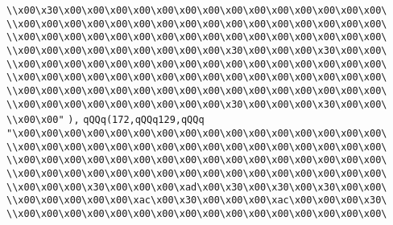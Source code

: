 \verb|\\x00\x30\x00\x00\x00\x00\x00\x00\x00\x00\x00\x00\x00\x00\x00\x00\|\newline
\verb|\\x00\x00\x00\x00\x00\x00\x00\x00\x00\x00\x00\x00\x00\x00\x00\x00\|\newline
\verb|\\x00\x00\x00\x00\x00\x00\x00\x00\x00\x00\x00\x00\x00\x00\x00\x00\|\newline
\verb|\\x00\x00\x00\x00\x00\x00\x00\x00\x00\x30\x00\x00\x00\x30\x00\x00\|\newline
\verb|\\x00\x00\x00\x00\x00\x00\x00\x00\x00\x00\x00\x00\x00\x00\x00\x00\|\newline
\verb|\\x00\x00\x00\x00\x00\x00\x00\x00\x00\x00\x00\x00\x00\x00\x00\x00\|\newline
\verb|\\x00\x00\x00\x00\x00\x00\x00\x00\x00\x00\x00\x00\x00\x00\x00\x00\|\newline
\verb|\\x00\x00\x00\x00\x00\x00\x00\x00\x00\x30\x00\x00\x00\x30\x00\x00\|\newline
\verb|\\x00\x00"|\newline
\verb|),|\newline
\verb|qQQq(172,qQQq129,qQQq|\newline
\verb|"\x00\x00\x00\x00\x00\x00\x00\x00\x00\x00\x00\x00\x00\x00\x00\x00\|\newline
\verb|\\x00\x00\x00\x00\x00\x00\x00\x00\x00\x00\x00\x00\x00\x00\x00\x00\|\newline
\verb|\\x00\x00\x00\x00\x00\x00\x00\x00\x00\x00\x00\x00\x00\x00\x00\x00\|\newline
\verb|\\x00\x00\x00\x00\x00\x00\x00\x00\x00\x00\x00\x00\x00\x00\x00\x00\|\newline
\verb|\\x00\x00\x00\x30\x00\x00\x00\xad\x00\x30\x00\x30\x00\x30\x00\x00\|\newline
\verb|\\x00\x00\x00\x00\x00\xac\x00\x30\x00\x00\x00\xac\x00\x00\x00\x30\|\newline
\verb|\\x00\x00\x00\x00\x00\x00\x00\x00\x00\x00\x00\x00\x00\x00\x00\x00\|\newline
